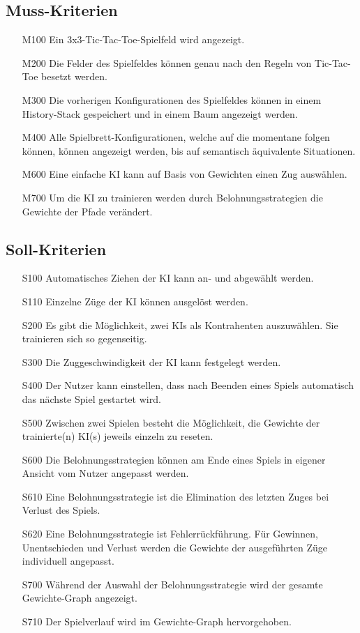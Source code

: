 \documentclass[titlepage]{scrartcl}
\begin{document}
\subsection{Muss-Kriterien}
	\begin{itemize}
		\item[M100] Ein 3x3-Tic-Tac-Toe-Spielfeld wird angezeigt.
		\item[M200] Die Felder des Spielfeldes können genau nach den Regeln von Tic-Tac-Toe besetzt werden.
		\item[M300] Die vorherigen Konfigurationen des Spielfeldes können in einem History-Stack gespeichert und in einem Baum angezeigt werden.
		\item[M400] Alle Spielbrett-Konfigurationen, welche auf die momentane folgen können, können angezeigt werden, bis auf semantisch äquivalente Situationen.
		\item[M600] Eine einfache KI kann auf Basis von Gewichten einen Zug auswählen.
		\item[M700] Um die KI zu trainieren werden durch Belohnungsstrategien die Gewichte der Pfade verändert.
	\end{itemize}


	\subsection{Soll-Kriterien}
	\begin{itemize}
		\item[S100] Automatisches Ziehen der KI kann an- und abgewählt werden.
		\item[S110] Einzelne Züge der KI können ausgelöst werden.
		\item[S200] Es gibt die Möglichkeit, zwei KIs als Kontrahenten auszuwählen. Sie trainieren sich so gegenseitig.
		\item[S300] Die Zuggeschwindigkeit der KI kann festgelegt werden.
		\item[S400] Der Nutzer kann einstellen, dass nach Beenden eines Spiels automatisch das nächste Spiel gestartet wird.
		\item[S500] Zwischen zwei Spielen besteht die Möglichkeit, die Gewichte der trainierte(n) KI(s) jeweils einzeln zu reseten.
		\item[S600] Die Belohnungsstrategien können am Ende eines Spiels in eigener Ansicht vom Nutzer angepasst werden.
		\item[S610] Eine Belohnungsstrategie ist die Elimination des letzten Zuges bei Verlust des Spiels.
		\item[S620] Eine Belohnungsstrategie ist Fehlerrückführung. Für Gewinnen, Unentschieden und Verlust werden die Gewichte der ausgeführten Züge individuell angepasst.
		\item[S700] Während der Auswahl der Belohnungsstrategie wird der gesamte Gewichte-Graph angezeigt.
		\item[S710] Der Spielverlauf wird im Gewichte-Graph hervorgehoben.
	\end{itemize}
\end{document}
